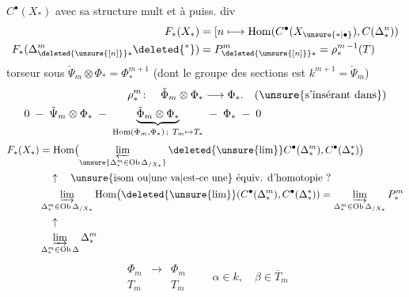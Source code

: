  \(C^\bullet(X_*)\) avec sa structure mult et à puiss. div
\[
\begin{aligned}
 F_*(X_*)&=[n\longmapsto\operatorname{Hom}(C^\bullet(X_{\unsure{*|\bullet}}),C(\Delta^n_*))\\
 F_*(\Delta^{m}_{{\deleted{\unsure{[n]}}}*}\deleted{{}^{*}})
 &=P^m_{\deleted{\unsure{[n]}}*}=\rho_*^{m\,-1}(T)
\end{aligned}
\]
torseur sous \(\check\Psi_m\otimes\Phi_*=\Phi_*^{m+1}\)
(dont le groupe des sections est \(k^{m+1}=\check\Psi_m\))
\[
\begin{aligned}
 \rho^m_*\colon\quad\check{\Phi}_m\otimes\Phi_*&\longrightarrow\Phi_*.
 \quad\text{(\unsure{s'insérant dans})}\\
 0\;-\;\check\Psi_m\otimes\Phi_* \;-\;
 \underbrace{\check{\Phi}_m\otimes\Phi_*}_{
 \operatorname{Hom}(\Phi_m,\Phi_*)\,;\ T_m\mapsto T_*}
 &\;-\;\Phi_*\;-\;0
\end{aligned}
\]
\[
 \begin{aligned}
 F_*(X_*)&=\operatorname{Hom}\bigl(\varprojlim_{\unsure{\Delta^m_*\in\mathrm{Ob}\,\Delta_{/X_*}}}
 \deleted{\unsure{\lim}} C^\bullet(\Delta^m_*),C^\bullet(\Delta^*_* )\bigr)\\
 &\hspace{1em}\uparrow\quad\text{\unsure{isom ou|une va|est-ce une} équiv. d'homotopie ?}\\
 &\varinjlim_{\Delta^m_*\in\mathrm{Ob}\,\Delta_{/X_*}}\operatorname{Hom}
 \bigl(\deleted{\unsure{\lim}}(C^\bullet(\Delta^m_*),C^\bullet(\Delta^*_*))=
 \varinjlim_{\Delta^m_*\in\mathrm{Ob}\,\Delta_{/X_*}}P^m_*\\
 &\hspace{1em}\uparrow\\
 &\varinjlim_{\Delta^m_*\in\mathrm{Ob}\,\Delta}\Delta^m_*
 \end{aligned}
\]
\[
 \begin{array}{ccc}\Phi_m&\longrightarrow&\Phi_m\\ T_m&&T_m\end{array}
 \qquad \alpha\in k,\quad\beta\in\overline{T}_m
\]
